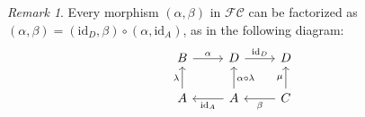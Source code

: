 \documentclass[12pt,reqno]{amsart}
\theoremstyle{definition}
\theoremstyle{remark}
\newtheorem{rem}[teo]{Remark}
\numberwithin{figure}{section}%
\newcommand{\CC}{\mathcal{C}}
\newcommand{\F}{\mathcal{F}}
\newcommand{\id}{\mathrm{id}}
\begin{document}





\begin{rem}\label{factorization}
Every morphism $(\alpha, \beta)$ in $\F \CC$ can be  factorized as $(\alpha, \beta)= (\id_D, \beta)\circ (\alpha,\id_A)$, as in the following diagram:
$$
\begin{tikzcd}
B \arrow[r, "\alpha"] & D \arrow[r, "\id_D"]                              & D                                   \\
A \arrow[u, "\lambda"]      & A \arrow[u, "\alpha \circ \lambda"'] \arrow[l, "\id_A"] & C \arrow[u, "\mu"] \arrow[l, "\beta"]
\end{tikzcd}
$$
\end{rem}
\end{document}
